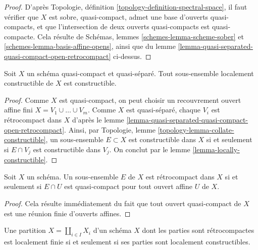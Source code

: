 \begin{proof}
D'après Topologie, définition \ref{topology-definition-spectral-space},
il faut vérifier que $X$ est sobre, quasi-compact, admet une base
d'ouverts quasi-compacts, et que l'intersection de deux
ouverts quasi-compacts est quasi-compacte. Cela résulte de
Schémas, lemmes \ref{schemes-lemma-scheme-sober} et
\ref{schemes-lemma-basis-affine-opens},
ainsi que du
lemme \ref{lemma-quasi-separated-quasi-compact-open-retrocompact}
ci-dessus.
\end{proof}

\begin{lemma}
\label{lemma-constructible-quasi-compact-quasi-separated}
Soit $X$ un schéma quasi-compact et quasi-séparé.
Tout sous-ensemble localement constructible de $X$ est constructible.
\end{lemma}

\begin{proof}
Comme $X$ est quasi-compact, on peut choisir un recouvrement ouvert affine fini
$X = V_1 \cup \ldots \cup V_m$. Comme $X$ est quasi-séparé, chaque $V_i$ est
rétrocompact dans $X$ d'après le
lemme \ref{lemma-quasi-separated-quasi-compact-open-retrocompact}.
Ainsi, par
Topologie, lemme \ref{topology-lemma-collate-constructible},
un sous-ensemble $E \subset X$ est constructible dans $X$ si et seulement si
$E \cap V_j$ est constructible dans $V_j$. On conclut par le
lemme \ref{lemma-locally-constructible}.
\end{proof}

\begin{lemma}
\label{lemma-retrocompact}
Soit $X$ un schéma. Un sous-ensemble $E$ de $X$ est rétrocompact dans $X$ si et seulement si
$E \cap U$ est quasi-compact pour tout ouvert affine $U$ de $X$.
\end{lemma}

\begin{proof}
Cela résulte immédiatement du fait que tout ouvert quasi-compact de $X$ est une réunion finie
d'ouverts affines.
\end{proof}

\begin{lemma}
\label{lemma-stratification-locally-finite-constructible}
Une partition $X = \coprod_{i \in I} X_i$ d'un schéma $X$ dont les
parties sont rétrocompactes est localement finie si et seulement si ses parties
sont localement constructibles.
\end{lemma}

